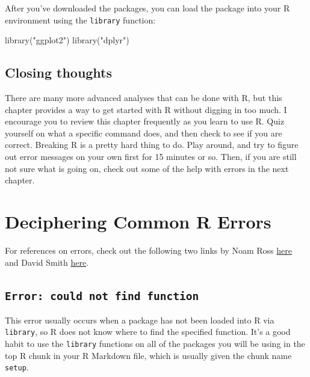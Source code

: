 \documentclass[]{tufte-book}
\newenvironment{Shaded}{\begin{snugshade}}{\end{snugshade}}
\newcommand{\FunctionTok}[1]{\textcolor[rgb]{0.00,0.00,0.00}{#1}}
\newcommand{\NormalTok}[1]{#1}
\newcommand{\StringTok}[1]{\textcolor[rgb]{0.31,0.60,0.02}{#1}}
\begin{document}
After you've downloaded the packages, you can load the package into your R environment using the \texttt{library} function:

\begin{Shaded}
\begin{Highlighting}[]
\FunctionTok{library}\NormalTok{(}\StringTok{"ggplot2"}\NormalTok{)}
\FunctionTok{library}\NormalTok{(}\StringTok{"dplyr"}\NormalTok{)}
\end{Highlighting}
\end{Shaded}

\hypertarget{closing-thoughts}{%
\section{Closing thoughts}\label{closing-thoughts}}

There are many more advanced analyses that can be done with R, but this chapter provides a way to get started with R without digging in too much. I encourage you to review this chapter frequently as you learn to use R. Quiz yourself on what a specific command does, and then check to see if you are correct. Breaking R is a pretty hard thing to do. Play around, and try to figure out error messages on your own first for 15 minutes or so. Then, if you are still not sure what is going on, check out some of the help with errors in the next chapter.

\hypertarget{errors}{%
\chapter{Deciphering Common R Errors}\label{errors}}

For references on errors, check out the following two links by Noam Ross \href{https://github.com/noamross/zero-dependency-problems/blob/master/misc/stack-overflow-common-r-errors.md}{here} and David Smith \href{http://blog.revolutionanalytics.com/2015/03/the-most-common-r-error-messages.html}{here}.

\hypertarget{error-could-not-find-function}{%
\section{\texorpdfstring{\texttt{Error:\ could\ not\ find\ function}}{Error: could not find function}}\label{error-could-not-find-function}}

This error usually occurs when a package has not been loaded into R via \texttt{library}, so R does not know where to find the specified function. It's a good habit to use the \texttt{library} functions on all of the packages you will be using in the top R chunk in your R Markdown file, which is usually given the chunk name \texttt{setup}.
\end{document}
